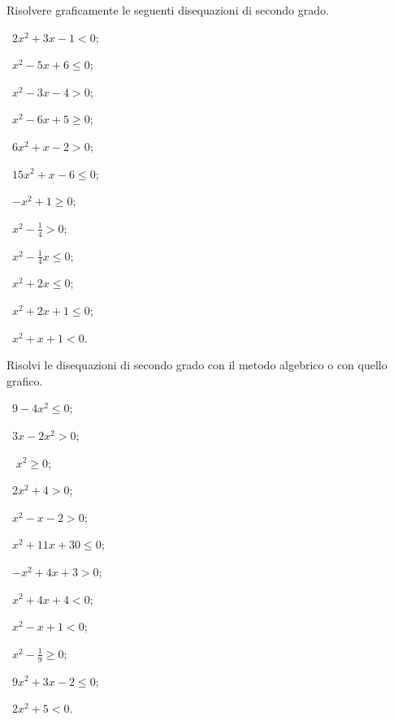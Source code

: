 \begin{esercizio}
 \label{ese:4.9}
Risolvere graficamente le seguenti disequazioni di secondo grado.
\begin{multicols}{3}
 \begin{enumeratea}
 \item~$ 2x^2+3x-1<0 $;
 \item~$ x^2-5x+6\le 0 $;
 \item~$ x^2-3x-4>0 $;
 \item~$ x^2-6x+5\ge 0 $;
 \item~$ 6x^2+x-2>0 $;
 \item~$ 15x^2+x-6\le 0 $;
 \item~$ -x^2+1\ge 0 $;
 \item~$ x^2-\frac 1 4>0 $;
 \item~$ x^2-\frac 1 4x\le 0 $;
 \item~$ x^2+2x\le 0 $;
 \item~$ x^2+2x+1\le 0 $;
 \item~$ x^2+x+1<0 $.
 \end{enumeratea}
 \end{multicols}
\end{esercizio}

\begin{esercizio}[\Ast]
 \label{ese:4.10}
Risolvi le disequazioni di secondo grado con il metodo algebrico o con quello grafico.
\begin{multicols}{3}
 \begin{enumeratea}
 \item~$9-4x^2\le 0$;
 \item~$3x-2x^2>0$;
 \item~ $x^2\ge 0$;
 \item~$2x^2+4>0$;
 \item~$x^2-x-2>0$;
 \item~$x^2+11x+30\le 0$;
 \item~$-x^2+4x+3>0$;
 \item~$x^2+4x+4<0$;
 \item~$x^2-x+1<0$;
 \item~$x^2-\frac 1 9\ge 0$;
 \item~$9x^2+3x-2\le 0$;
 \item~$2x^2+5<0$.
 \end{enumeratea}
 \end{multicols}
\end{esercizio}

